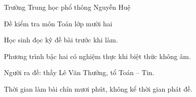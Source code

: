 \documentclass[12pt]{article}
\begin{document}
Trường Trung học phổ thông Nguyễn Huệ

Đề kiểm tra môn Toán lớp mười hai

Học sinh đọc kỹ đề bài trước khi làm.

Phương trình bậc hai có nghiệm thực khi biệt thức không âm.

Người ra đề: thầy Lê Văn Thưởng, tổ Toán – Tin.

Thời gian làm bài chín mươi phút, không kể thời gian phát đề.
\end{document}
